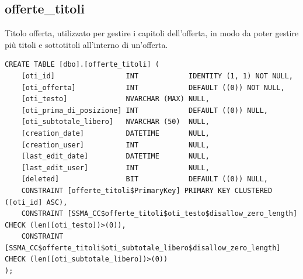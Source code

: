 \documentclass[12pt]{article}
\begin{document}
\subsection{offerte\_titoli}
Titolo offerta, utilizzato per gestire i capitoli dell'offerta, in modo da poter gestire più titoli e sottotitoli all'interno di un'offerta.
\begin{lstlisting}
CREATE TABLE [dbo].[offerte_titoli] (
    [oti_id]                 INT            IDENTITY (1, 1) NOT NULL,
    [oti_offerta]            INT            DEFAULT ((0)) NOT NULL,
    [oti_testo]              NVARCHAR (MAX) NULL,
    [oti_prima_di_posizione] INT            DEFAULT ((0)) NULL,
    [oti_subtotale_libero]   NVARCHAR (50)  NULL,
    [creation_date]          DATETIME       NULL,
    [creation_user]          INT            NULL,
    [last_edit_date]         DATETIME       NULL,
    [last_edit_user]         INT            NULL,
    [deleted]                BIT            DEFAULT ((0)) NULL,
    CONSTRAINT [offerte_titoli$PrimaryKey] PRIMARY KEY CLUSTERED ([oti_id] ASC),
    CONSTRAINT [SSMA_CC$offerte_titoli$oti_testo$disallow_zero_length] CHECK (len([oti_testo])>(0)),
    CONSTRAINT [SSMA_CC$offerte_titoli$oti_subtotale_libero$disallow_zero_length] CHECK (len([oti_subtotale_libero])>(0))
);
\end{lstlisting}
\end{document}

